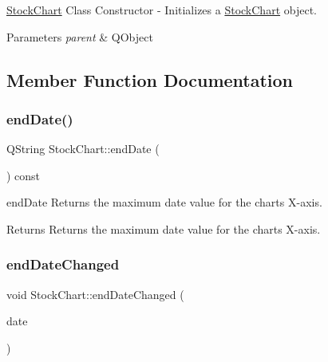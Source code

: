 \hyperlink{class_stock_chart}{Stock\+Chart} Class Constructor -\/ Initializes a \hyperlink{class_stock_chart}{Stock\+Chart} object. 


\begin{DoxyParams}{Parameters}
{\em parent} & Q\+Object \\
\hline
\end{DoxyParams}


\subsection{Member Function Documentation}
\mbox{\label{class_stock_chart_a0c4ea05e46ed7c7b200063ec34241db1}} 
\subsubsection{\texorpdfstring{end\+Date()}{endDate()}}
{\footnotesize\ttfamily Q\+String Stock\+Chart\+::end\+Date (\begin{DoxyParamCaption}{ }\end{DoxyParamCaption}) const}



end\+Date Returns the maximum date value for the chart\textquotesingle{}s X-\/axis. 

\begin{DoxyReturn}{Returns}
Returns the maximum date value for the chart\textquotesingle{}s X-\/axis. 
\end{DoxyReturn}
\mbox{\label{class_stock_chart_a4f7074ac61cf94ca61eb85d6869846c3}} 
\subsubsection{\texorpdfstring{end\+Date\+Changed}{endDateChanged}}
{\footnotesize\ttfamily void Stock\+Chart\+::end\+Date\+Changed (\begin{DoxyParamCaption}\item[{const Q\+String \&}]{date }\end{DoxyParamCaption})\hspace{0.3cm}{\ttfamily [signal]}}



